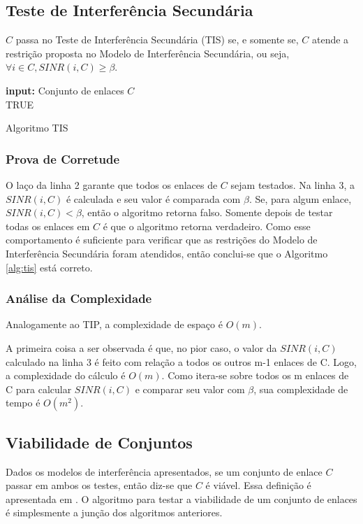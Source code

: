 \subsection{Teste de Interferência Secundária}

$C$ passa no Teste de Interferência Secundária (TIS) se, e somente se, $C$ atende a restrição proposta no Modelo de Interferência Secundária, ou seja, $\forall i \in C, SINR(i,C) \geq \beta$.

\begin{algorithm}[h]
	\SetVline
	{\bf input:} Conjunto de enlaces $C$\\
	\Return TRUE
\caption{Algoritmo TIS}
\label{alg:tis}
\end{algorithm}

\subsubsection{Prova de Corretude}

O laço da linha 2 garante que todos os enlaces de $C$ sejam testados. Na linha 3, a $SINR(i,C)$ é calculada e seu valor é comparada com $\beta$. Se, para algum enlace, $SINR(i,C)<\beta$, então o algoritmo retorna falso. Somente depois de testar todas os enlaces em $C$ é que o algoritmo retorna verdadeiro. Como esse comportamento é suficiente para verificar que as restrições do Modelo de Interferência Secundária foram atendidos, então conclui-se que o Algoritmo \ref{alg:tis} está correto.

\subsubsection{Análise da Complexidade}

Analogamente ao TIP, a complexidade de espaço é $O(m)$.

A primeira coisa a ser observada é que, no pior caso, o valor da $SINR(i,C)$ calculado na linha 3 é feito com relação a todos os outros m-1 enlaces de C. Logo, a complexidade do cálculo é $O(m)$. Como itera-se sobre todos os m enlaces de C para calcular $SINR(i,C)$ e comparar seu valor com $\beta$, sua complexidade de tempo é $O(m^2)$. 

\subsection{Viabilidade de Conjuntos}

Dados os modelos de interferência apresentados, se um conjunto de enlace $C$ passar em ambos os testes, então diz-se que $C$ é viável. Essa definição é apresentada em \cite{scheduling}. O algoritmo para testar a viabilidade de um conjunto de enlaces é simplesmente a junção dos algoritmos anteriores.

